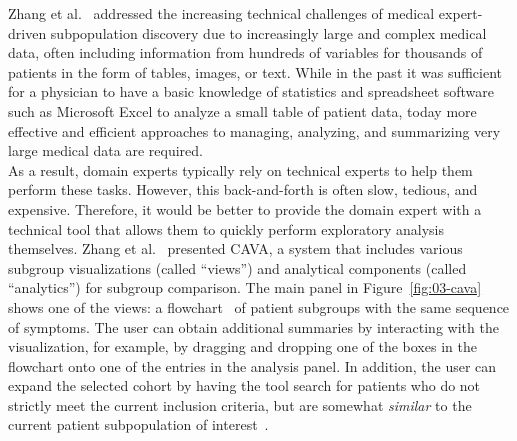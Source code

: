 \documentclass[
  oneside]{book}
\begin{document}
Zhang et al.~\autocite{Zhang:CAVA2015} addressed the increasing technical challenges of medical expert-driven subpopulation discovery due to increasingly large and complex medical data, often including information from hundreds of variables for thousands of patients in the form of tables, images, or text.
While in the past it was sufficient for a physician to have a basic knowledge of statistics and spreadsheet software such as Microsoft Excel to analyze a small table of patient data, today more effective and efficient approaches to managing, analyzing, and summarizing very large medical data are required.\\
As a result, domain experts typically rely on technical experts to help them perform these tasks.
However, this back-and-forth is often slow, tedious, and expensive.
Therefore, it would be better to provide the domain expert with a technical tool that allows them to quickly perform exploratory analysis themselves.
Zhang et al.~\autocite{Zhang:CAVA2015} presented CAVA, a system that includes various subgroup visualizations (called ``views'') and analytical components (called ``analytics'') for subgroup comparison.
The main panel in Figure~\ref{fig:03-cava} shows one of the views: a flowchart~\autocite{wongsuphasawat2012exploring} of patient subgroups with the same sequence of symptoms.
The user can obtain additional summaries by interacting with the visualization, for example, by dragging and dropping one of the boxes in the flowchart onto one of the entries in the analysis panel.
In addition, the user can expand the selected cohort by having the tool search for patients who do not strictly meet the current inclusion criteria, but are somewhat \emph{similar} to the current patient subpopulation of interest~\autocite{ebadollahi2010predicting}.
\end{document}
